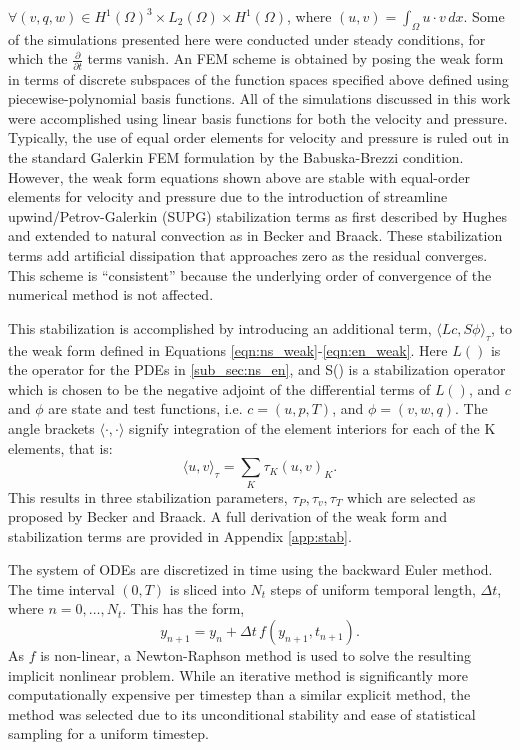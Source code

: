 $\forall (v,q,w) \in H^1(\Omega)^3 \times L_2(\Omega) \times
H^1(\Omega)$, where $(u,v) = \int_\Omega u \cdot v \, dx$.  
Some of the simulations presented here were conducted under
steady conditions, for which the $\frac{\partial}{\partial t}$ terms
vanish. An FEM scheme is obtained by posing the weak form in
terms of discrete subspaces of the function spaces specified above
defined using piecewise-polynomial basis functions. All of the
simulations discussed in this work were accomplished using 
linear basis functions for both the velocity and pressure. 
Typically, the use of equal order elements for velocity and pressure is
ruled out in the standard Galerkin FEM formulation by the Babuska-Brezzi
condition\cite{bb-cond}. 
However, the weak form equations shown above are stable with equal-order
elements for velocity and pressure due to the introduction of streamline
upwind/Petrov-Galerkin (SUPG) stabilization terms as first described by
Hughes\cite{Hughes198685,supg} and extended to natural convection as in
Becker and Braack\cite{Becker2002428}. These stabilization terms add
artificial dissipation that approaches zero as the residual
converges. This scheme is ``consistent'' because the underlying order of
convergence of the numerical method is not affected\cite{hughes2000finite}. 

This stabilization is accomplished by introducing an additional term,
$\langle Lc,S\phi \rangle_\tau$, to the weak form defined in Equations
\ref{eqn:ns_weak}-\ref{eqn:en_weak}. Here $L()$ is the operator for the PDEs
in \ref{sub_sec:ns_en}, and S() is a stabilization operator
which is chosen to be the negative adjoint of the differential terms of
$L()$, and $c$ and $\phi$ are state and test functions, i.e. 
$ c= (u,p,T)$, and $\phi = ( v,w,q )$. 
The angle brackets $\langle \cdot,\cdot \rangle$ signify integration of
the element interiors for each of the K elements, that is:
\begin{equation}
 \langle u,v \rangle_\tau = \sum_K \tau_K(u,v)_K.
\end{equation}
This results in three stabilization parameters, $\tau_P, \tau_v, \tau_T$ 
which are selected as proposed by Becker and Braack. 
A full derivation of the weak form and stabilization terms are provided
in Appendix \ref{app:stab}. 

The system of ODEs are discretized in time using the 
backward Euler method\cite{moin2010fundamentals}. The time interval
$(0,T)$ is sliced into $N_t$ steps of 
uniform temporal length,  $\Delta t$, where $n = 0,\dots,N_t$. 
This has the form, 
\begin{equation}
 y_{n+1} = y_n + \Delta t \, f(y_{n+1},t_{n+1}).
\end{equation}
As $f$ is non-linear, a Newton-Raphson method is used to solve the
resulting implicit nonlinear problem. While an iterative method is
significantly more computationally expensive per timestep than a similar
explicit method, the method was selected due to its unconditional
stability and ease of statistical sampling for a uniform timestep. 


